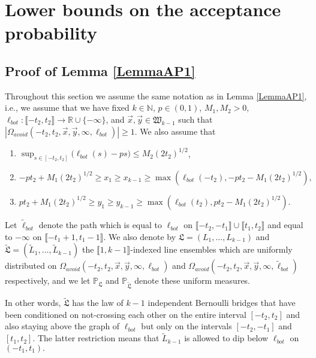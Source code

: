 %
\section{Lower bounds on the acceptance probability}\label{Section6}

\subsection{Proof of Lemma \ref{LemmaAP1}}\label{sect61} Throughout this section we assume the same notation as in Lemma \ref{LemmaAP1}, i.e., we assume that we have fixed $k \in \mathbb{N}$, $p \in (0,1)$, $M_1, M_2 > 0$, $\ell_{bot}: \llbracket -t_2, t_2 \rrbracket \rightarrow \mathbb{R} \cup \{ - \infty \}$, and $\vec{x}, \vec{y} \in \mathfrak{W}_{k-1}$ such that $|\Omega_{avoid}(-t_2, t_2, \vec{x}, \vec{y}, \infty, \ell_{bot})| \geq 1$. We also assume that
\begin{enumerate}
	\item $\sup_{s \in [- t_2,t_2]}\big(\ell_{bot}(s)  - ps \big)  \leq M_2 (2t_2)^{1/2}$,
	\item  $-pt_2 + M_1 (2t_2)^{1/2} \geq  x_1 \geq  x_{k-1} \geq \max\left(\ell_{bot}(-t_2), -pt_2- M_1 (2t_2)^{1/2}\right),$
	\item $pt_2 + M_1 (2t_2)^{1/2} \geq y_1 \geq y_{k-1} \geq  \max \left( \ell_{bot}(t_2),  p t_2- M_1(2t_2)^{1/2} \right).$
\end{enumerate}

\begin{definition}\label{TildeDef}
	Let $\tilde{\ell}_{bot}$ denote the path which is equal to $\ell_{bot}$ on $\llbracket-t_2,-t_1\rrbracket \cup \llbracket t_1,t_2\rrbracket$ and equal to $-\infty$ on $\llbracket -t_1 + 1, t_1 - 1\rrbracket$. We also denote by $\mathfrak{L} = (L_1,\dots,L_{k-1})$ and $\tilde{\mathfrak{L}} = (\tilde{L}_1, \dots, \tilde{L}_{k-1})$ the $\llbracket 1, k-1 \rrbracket$-indexed line ensembles which are uniformly distributed on $\Omega_{avoid}(-t_2,t_2,\vec{x},\vec{y},\infty,\ell_{bot})$ and $\Omega_{avoid}(-t_2, t_2, \vec{x}, \vec{y}, \infty, \tilde{\ell}_{bot})$ respectively, and we let $\mathbb{P}_{\mathfrak{L}}$ and $\mathbb{P}_{\tilde{\mathfrak{L}}}$ denote these uniform measures.
\end{definition}
In other words, $\tilde{\mathfrak{L}}$ has the law of $k-1$ independent Bernoulli bridges that have been conditioned on not-crossing each other on the entire interval $[-t_2, t_2]$ and also staying above the graph of $\ell_{bot}$ but only on the intervals $[-t_2, -t_1]$ and $[t_1, t_2]$. The latter restriction means that $\tilde{L}_{k-1}$ is allowed to dip below $\ell_{bot}$ on $(-t_1, t_1).$ 

